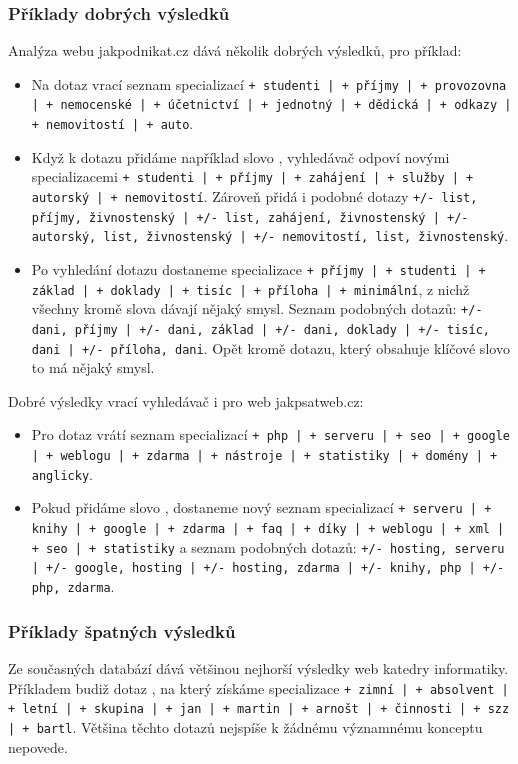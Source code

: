 \documentclass[12pt]{article}
\newcommand{\code}[1]{\texttt{#1}}
\newcommand{\sssection}[1]{\subsubsection{#1}}
\begin{document}
\sssection{Příklady dobrých výsledků}
Analýza webu jakpodnikat.cz dává několik dobrých výsledků, pro příklad:

\begin{itemize}
	\item Na dotaz  vrací seznam specializací \code{+ studenti | + příjmy | + provozovna | + nemocenské | + účetnictví | + jednotný | + dědická | + odkazy | + nemovitostí | + auto}.
	\item Když k dotazu přidáme například slovo , vyhledávač odpoví novými specializacemi \code{+ studenti | + příjmy | + zahájení | + služby | + autorský | + nemovitostí}. Zároveň přidá i podobné dotazy \code{+/- list, příjmy, živnostenský | +/- list, zahájení, živnostenský | +/- autorský, list, živnostenský | +/- nemovitostí, list, živnostenský}.
	\item Po vyhledání dotazu  dostaneme specializace \code{+ příjmy | + studenti | + základ | + doklady | + tisíc | + příloha | + minimální}, z nichž všechny kromě slova  dávají nějaký smysl. Seznam podobných dotazů: \code{+/- dani, příjmy | +/- dani, základ | +/- dani, doklady | +/- tisíc, dani | +/- příloha, dani}. Opět kromě dotazu, který obsahuje klíčové slovo  to má nějaký smysl. 
\end{itemize}

Dobré výsledky vrací vyhledávač i pro web jakpsatweb.cz: 

\begin{itemize}
	\item Pro dotaz  vrátí seznam specializací \code{+ php | + serveru | + seo | + google | + weblogu | + zdarma | + nástroje | + statistiky | + domény | + anglicky}. 
	\item Pokud přidáme slovo , dostaneme nový seznam specializací \code{+ serveru | + knihy | + google | + zdarma | + faq | + díky | + weblogu | + xml | + seo | + statistiky} a seznam podobných dotazů: \code{+/- hosting, serveru | +/- google, hosting | +/- hosting, zdarma | +/- knihy, php | +/- php, zdarma}.
\end{itemize}

\sssection{Příklady špatných výsledků}

Ze současných databází dává většinou nejhorší výsledky web katedry informatiky. Příkladem budiž dotaz , na který získáme specializace \code{+ zimní | + absolvent | + letní | + skupina | + jan | + martin | + arnošt | + činnosti | + szz | + bartl}. Většina těchto dotazů nejspíše k žádnému významnému konceptu nepovede. 
\end{document}
